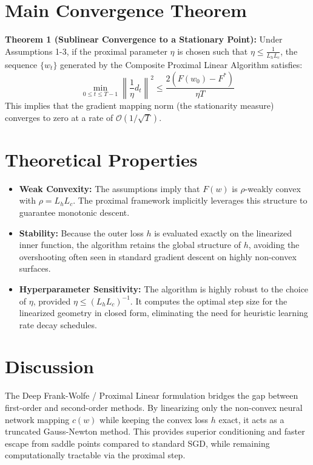 \documentclass[11pt]{article}
\begin{document}
\section*{Main Convergence Theorem}
\textbf{Theorem 1 (Sublinear Convergence to a Stationary Point):} 
Under Assumptions 1-3, if the proximal parameter $\eta$ is chosen such that $\eta \leq \frac{1}{L_h L_c}$, the sequence $\{w_t\}$ generated by the Composite Proximal Linear Algorithm satisfies:
\begin{equation}
    \min_{0 \leq t \leq T-1} \left\| \frac{1}{\eta} d_t \right\|^2 \leq \frac{2(F(w_0) - F^*)}{\eta T}
\end{equation}
This implies that the gradient mapping norm (the stationarity measure) converges to zero at a rate of $\mathcal{O}(1/\sqrt{T})$.

\section*{Theoretical Properties}
\begin{itemize}
    \item \textbf{Weak Convexity:} The assumptions imply that $F(w)$ is $\rho$-weakly convex with $\rho = L_h L_c$. The proximal framework implicitly leverages this structure to guarantee monotonic descent.
    \item \textbf{Stability:} Because the outer loss $h$ is evaluated exactly on the linearized inner function, the algorithm retains the global structure of $h$, avoiding the overshooting often seen in standard gradient descent on highly non-convex surfaces.
    \item \textbf{Hyperparameter Sensitivity:} The algorithm is highly robust to the choice of $\eta$, provided $\eta \leq (L_h L_c)^{-1}$. It computes the optimal step size for the linearized geometry in closed form, eliminating the need for heuristic learning rate decay schedules.
\end{itemize}

\section*{Discussion}
The Deep Frank-Wolfe / Proximal Linear formulation bridges the gap between first-order and second-order methods. By linearizing only the non-convex neural network mapping $c(w)$ while keeping the convex loss $h$ exact, it acts as a truncated Gauss-Newton method. This provides superior conditioning and faster escape from saddle points compared to standard SGD, while remaining computationally tractable via the proximal step.
\end{document}
